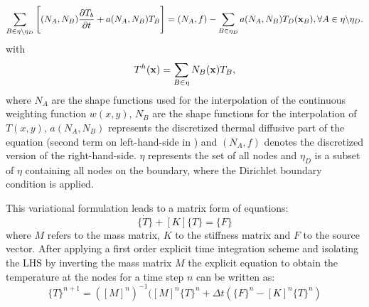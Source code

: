 \begin{equation}
	\sum_{B \in \eta \backslash \eta_D} \Bigg[(N_A,N_B) \frac{\partial T_b}{\partial t} + a(N_A,N_B)T_B \Bigg] = (N_A,f) - \sum_{B \in \eta_D} a(N_A,N_B)T_D(\boldsymbol{\mathbf{x}}_B), \forall A \in \eta \backslash \eta_D .
\end{equation}
with
\begin{equation}
	T^h(\boldsymbol{\mathbf{x}}) = \sum_{B\in \eta}N_B(\boldsymbol{\mathbf{x}})T_B ,
\end{equation}
where $N_A$ are the shape functions used for the interpolation of the continuous weighting function $w(x,y)$, $N_B$ are the shape functions for the interpolation of $T(x,y)$, $a(N_A, N_B)$ represents the discretized thermal diffusive part of the equation (second term on left-hand-side in ) and $(N_A,f)$ denotes the discretized version of the right-hand-side. $\eta$ represents the set of all nodes and $\eta_D$ is a subset of $\eta$ containing all nodes on the boundary, where the Dirichlet boundary condition is applied.

This variational formulation leads to a matrix form of equations:
\begin{equation}
	[M] \Big\{ \dot{T} \Big\} + [K] \Big\{ T \Big\} = \Big\{ F \Big\} 
\end{equation}
where $M$ refers to the mass matrix, $K$ to the stiffness matrix and $F$ to the source vector. After applying a first order explicit time integration scheme and isolating the LHS by inverting the mass matrix $M$ the explicit equation to obtain the temperature at the nodes for a time step $n$ can be written as:
\begin{equation}
	\label{eq:LHS}
	\{T\}^{n+1} = ([M]^n)^{-1}([M]^n\{T\}^n + \Delta t(\{F\}^n-[K]^n\{T\}^n)
\end{equation}

